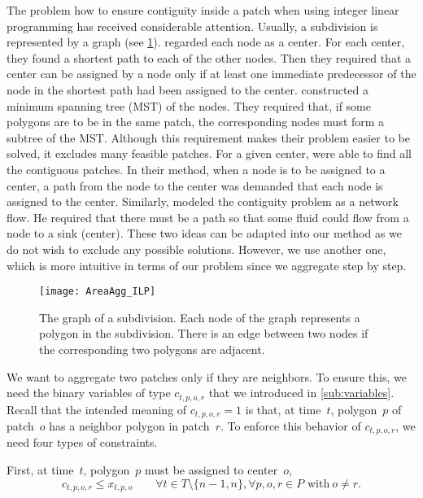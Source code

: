 The problem how to ensure contiguity inside a patch 
when using integer linear programming 
has received considerable attention.
Usually, a subdivision is represented by a graph
(see \fig\ref{fig:AreaAgg_Variables_Graph}).
%
\textcite{Zoltners1983Territory} regarded each node as a center.
For each center, they found a shortest path 
to each of the other nodes.
Then they required that a center can be assigned 
by a node only if 
at least one immediate predecessor of the node 
in the shortest path had been assigned to the center.
%
\textcite{Williams2002Contiguous} constructed a minimum spanning 
tree (MST) of the nodes.
They required that,
if some polygons are to be in the same patch,
the corresponding nodes must 
form a subtree of the MST.
%
Although this requirement makes their problem easier to be solved,
it excludes many feasible patches.
For a given center, \textcite{Cova2000_Contiguity} 
were able to find all the contiguous patches.
In their method, when a node is to be assigned to a center, 
a path from the node to the center was demanded 
that each node is assigned to the center.
%
Similarly, \textcite{Shirabe2005Contiguity} modeled 
the contiguity problem as a network flow.
He required that there must be a path so that 
some fluid could flow from a node to a sink (center).
%
These two ideas can be adapted into our method
as we do not wish to exclude any possible solutions.
However, we use another one,
which is more intuitive in terms of our problem
since we aggregate step by step.


\begin{figure}[tb]
	\centering
	\texttt{[image: AreaAgg\_ILP]}
	\caption{The graph of a subdivision.
		Each node of the graph represents a polygon in the 
		subdivision.
		There is an edge between two nodes
		if the corresponding two polygons are adjacent.
	}
	\label{fig:AreaAgg_Variables_Graph}
\end{figure} 

We want to aggregate two patches only if they are neighbors.
To ensure this, we need the binary variables of type $c_{t,p,o,r}$
that we introduced in \sect\ref{sub:variables}.
Recall that the intended meaning of $c_{t,p,o,r}=1$ is that, at time~$t$, 
polygon~$p$ of patch~$o$ has a neighbor polygon in patch~$r$.
To enforce this behavior of $c_{t,p,o,r}$, we need four types of
constraints.

First, at time~$t$, polygon~$p$ must be assigned to center~$o$,
\begin{equation}
\label{eq:CstrC_Part}
c_{t,p,o,r} \le x_{t,p,o} \qquad
\forall t 	 \in T\setminus \{n-1,n\},  
\forall p, o, r \in P \text{~with}~o\ne r.
\end{equation}

